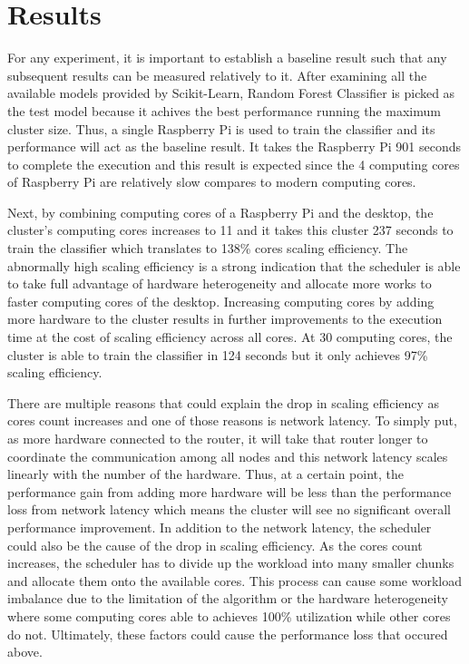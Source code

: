 \documentclass[conference]{IEEEtran}
\begin{document}
    \section{Results}   
        For any experiment, it is important to establish a baseline result such that any subsequent results can be measured relatively to it. After examining all the available models provided by Scikit-Learn, Random Forest Classifier is picked as the test model because it achives the best performance running the maximum cluster size. Thus, a single Raspberry Pi is used to train the classifier and its performance will act as the baseline result. It takes the Raspberry Pi 901 seconds to complete the execution and this result is expected since the 4 computing cores of Raspberry Pi are relatively slow compares to modern computing cores. 
            
        Next, by combining computing cores of a Raspberry Pi and the desktop, the cluster's computing cores increases to 11 and it takes this cluster 237 seconds to train the classifier which translates to 138\% cores scaling efficiency. The abnormally high scaling efficiency is a strong indication that the scheduler is able to take full advantage of hardware heterogeneity and allocate more works to faster computing cores of the desktop. Increasing computing cores by adding more hardware to the cluster results in further improvements to the execution time at the cost of scaling efficiency across all cores. At 30 computing cores, the cluster is able to train the classifier in 124 seconds but it only achieves 97\% scaling efficiency. 
        
        There are multiple reasons that could explain the drop in scaling efficiency as cores count increases and one of those reasons is network latency. To simply put, as more hardware connected to the router, it will take that router longer to coordinate the communication among all nodes and this network latency scales linearly with the number of the hardware. Thus, at a certain point, the performance gain from adding more hardware will be less than the performance loss from network latency which means the cluster will see no significant overall performance improvement. In addition to the network latency, the scheduler could also be the cause of the drop in scaling efficiency. As the cores count increases, the scheduler has to divide up the workload into many smaller chunks and allocate them onto the available cores. This process can cause some workload imbalance due to the limitation of the algorithm or the hardware heterogeneity where some computing cores able to achieves 100\% utilization while other cores do not. Ultimately, these factors could cause the performance loss that occured above.              
\end{document}
